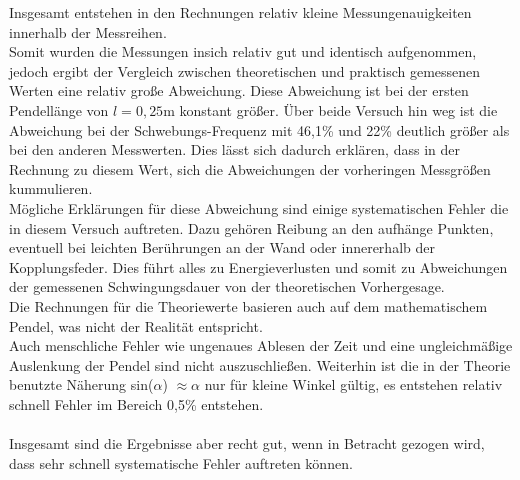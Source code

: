         \noindent Insgesamt entstehen in den Rechnungen relativ kleine Messungenauigkeiten innerhalb der Messreihen.\\ Somit wurden die 
        Messungen insich relativ gut und identisch aufgenommen, jedoch ergibt der Vergleich zwischen theoretischen und praktisch 
        gemessenen Werten eine relativ große Abweichung. Diese Abweichung ist bei der ersten Pendellänge von $l = 0,25 \si{\meter}$ 
        konstant größer. Über beide Versuch hin weg ist die Abweichung bei der Schwebungs-Frequenz mit 46,1\% und 22\% deutlich größer als bei 
        den anderen Messwerten. Dies lässt sich dadurch erklären, dass in der Rechnung zu diesem Wert, sich die Abweichungen der vorheringen 
        Messgrößen kummulieren.\\

        \noindent Mögliche Erklärungen für diese Abweichung sind einige systematischen Fehler die in diesem Versuch auftreten. Dazu gehören 
        Reibung an den aufhänge Punkten, eventuell bei leichten Berührungen an der Wand oder innererhalb der Kopplungsfeder. Dies führt 
        alles zu Energieverlusten und somit zu Abweichungen der gemessenen Schwingungsdauer von der theoretischen Vorhergesage.\\
        Die Rechnungen für die Theoriewerte basieren auch auf dem mathematischem Pendel, was nicht der Realität entspricht.\\
        Auch menschliche Fehler wie ungenaues Ablesen der Zeit und eine ungleichmäßige Auslenkung der Pendel sind nicht auszuschließen.
        Weiterhin ist die in der Theorie benutzte Näherung sin($\alpha$) $\approx \alpha$ nur für kleine Winkel gültig, es entstehen 
        relativ schnell Fehler im Bereich 0,5\% entstehen.\\\\

        \noindent Insgesamt sind die Ergebnisse aber recht gut, wenn in Betracht gezogen wird, dass sehr schnell systematische Fehler auftreten können.
\newpage
